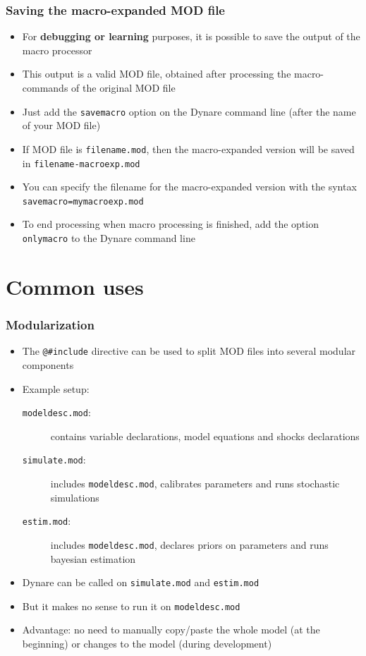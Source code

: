 \documentclass{beamer}
\begin{document}
\begin{frame}
  \frametitle{Saving the macro-expanded MOD file}
  \begin{itemize}
  \item For \textbf{debugging or learning} purposes, it is possible to save the output of the macro processor
  \item This output is a valid MOD file, obtained after processing the macro-commands of the original MOD file
  \item Just add the \texttt{savemacro} option on the Dynare command line (after the name of your MOD file)
  \item If MOD file is \texttt{filename.mod}, then the macro-expanded version will be saved in \texttt{filename-macroexp.mod}
  \item You can specify the filename for the macro-expanded version with the syntax \texttt{savemacro=mymacroexp.mod}
  \item To end processing when macro processing is finished, add the option \texttt{onlymacro} to the Dynare command line
  \end{itemize}
\end{frame}

\section{Common uses}

\begin{frame}[fragile=singleslide]
  \frametitle{Modularization}
  \begin{itemize}
  \item The \verb+@#include+ directive can be used to split MOD files into several modular components
  \item Example setup:
    \begin{description}
    \item[\texttt{modeldesc.mod}:] contains variable declarations, model equations and shocks declarations
    \item[\texttt{simulate.mod}:] includes \texttt{modeldesc.mod}, calibrates parameters and runs stochastic simulations
    \item[\texttt{estim.mod}:] includes \texttt{modeldesc.mod}, declares priors on parameters and runs bayesian estimation
    \end{description}
  \item Dynare can be called on \texttt{simulate.mod} and \texttt{estim.mod}
  \item But it makes no sense to run it on \texttt{modeldesc.mod}
  \item Advantage: no need to manually copy/paste the whole model (at the beginning) or changes to the model (during development)
  \end{itemize}
\end{frame}
\end{document}
